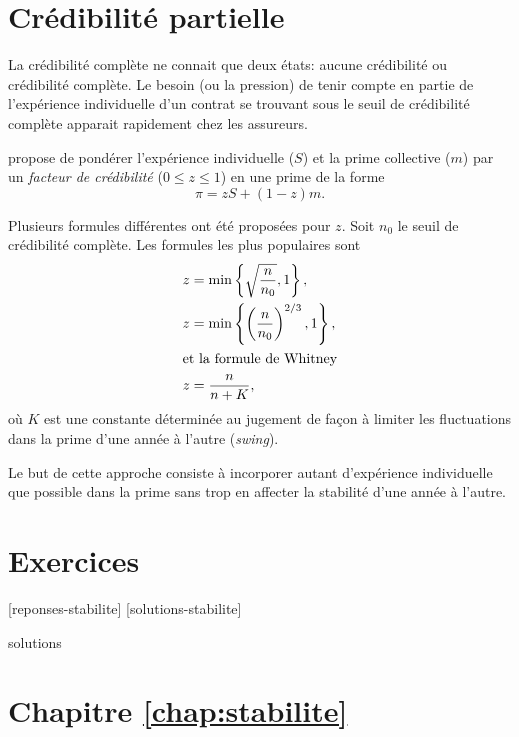 \section{Crédibilité partielle}
\label{sec:stabilite:partielle}

La crédibilité complète ne connait que deux états: aucune crédibilité
ou crédibilité complète. Le besoin (ou la pression) de tenir compte en
partie de l'expérience individuelle d'un contrat se trouvant sous le
seuil de crédibilité complète apparait rapidement chez les assureurs.

\citet{Whitney:1918} propose de pondérer l'expérience individuelle
($S$) et la prime collective ($m$) par un \emph{facteur de
  crédibilité} ($0 \leq z \leq 1$) en une prime de la forme
\begin{displaymath}
  \pi = z S + (1 - z) m.
\end{displaymath}

Plusieurs formules différentes ont été proposées pour $z$. Soit $n_0$
le seuil de crédibilité complète. Les formules les plus populaires
sont
\begin{align*}
  z &= \min \left\{ \sqrt{\frac{n}{n_0}}, 1 \right\}, \\
  z &= \min \left\{ \left( \frac{n}{n_0} \right)^{2/3}, 1 \right\}, \\
  \intertext{et la formule de Whitney}
  z &= \frac{n}{n + K},
\end{align*}
où $K$ est une constante déterminée au jugement de façon à limiter les
fluctuations dans la prime d'une année à l'autre (\emph{swing}).

Le but de cette approche consiste à incorporer autant d'expérience
individuelle que possible dans la prime sans trop en affecter la
stabilité d'une année à l'autre.



\section{Exercices}
\label{sec:stabilite:exercices}

[reponses-stabilite]
[solutions-stabilite]

\begin{Filesave}{solutions}
\section*{Chapitre \ref*{chap:stabilite}}

\end{Filesave}

